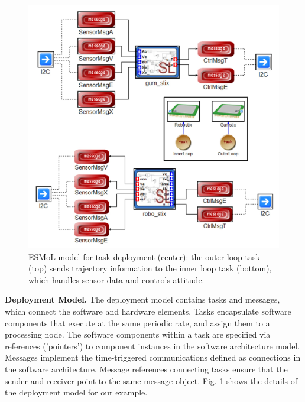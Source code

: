 \begin{figure}[ht]
\centering
\includegraphics[width=\columnwidth]{figures/deploy.jpg}
    \caption{ESMoL model for task deployment (center): the outer loop task (top) sends trajectory information to the inner loop task (bottom), which handles sensor data and controls attitude.}
    \label{fig:deploy}
\end{figure}

\textbf{Deployment Model.} The deployment model contains tasks and messages, which connect the software and hardware elements.  Tasks encapsulate software components that execute at the same periodic rate, and assign them to a processing node.  The software components within a task are specified via references ('pointers') to component instances in the software architecture model.  Messages implement the time-triggered communications defined as connections in the software architecture.  Message references connecting tasks ensure that the sender and receiver point to the same message object.  Fig. \ref{fig:deploy} shows the details of the deployment model for our example.


